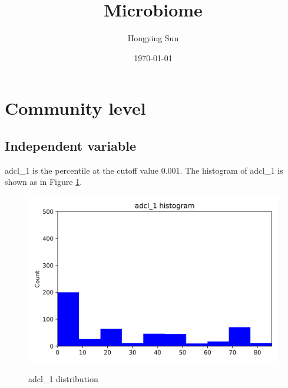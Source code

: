 \documentclass{article}
\title{Microbiome}
\author{Hongying Sun
	}
\date{\today}
\begin{document}
\maketitle

\section{Community level}
\subsection{Independent variable}
adcl_1 is the percentile at the cutoff value 0.001. The histogram of adcl_1 is shown as in Figure \ref{adcl_1-communitylevel}.\par
\begin{figure}[H]
	\centering
	\includegraphics[width=\textwidth, keepaspectratio]{adcl_1-communitylevel.png}\\
	\caption{adcl_1 distribution}
	\label{adcl_1-communitylevel}
\end{figure}
\end{document}
